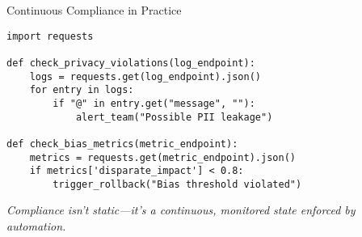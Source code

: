 \documentclass[aspectratio=169]{beamer}
\begin{document}
%
%
\begin{frame}{Continuous Compliance in Practice}
\begin{verbatim}
import requests

def check_privacy_violations(log_endpoint):
    logs = requests.get(log_endpoint).json()
    for entry in logs:
        if "@" in entry.get("message", ""):
            alert_team("Possible PII leakage")

def check_bias_metrics(metric_endpoint):
    metrics = requests.get(metric_endpoint).json()
    if metrics['disparate_impact'] < 0.8:
        trigger_rollback("Bias threshold violated")
\end{verbatim}

\emph{Compliance isn’t static—it’s a continuous, monitored state enforced by automation.}
\end{frame}
\end{document}
